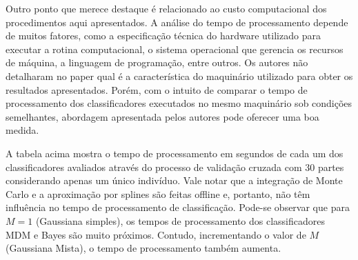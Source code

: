 \documentclass[a4paper,titlepage]{article}
\begin{document}
Outro ponto que merece destaque é relacionado ao custo computacional dos
procedimentos aqui apresentados. A análise do tempo de processamento depende
de muitos fatores, como a especificação técnica do hardware utilizado para
executar a rotina computacional, o sistema operacional que gerencia os recursos
de máquina, a linguagem de programação, entre outros. Os autores não detalharam
no paper qual é a característica do maquinário utilizado para obter os resultados
apresentados. Porém, com o intuito de comparar o tempo de processamento dos
classificadores executados no mesmo maquinário sob condições semelhantes,
abordagem apresentada pelos autores pode oferecer uma boa medida.

\begin{center}
  \vspace{1em}
  \vspace{1em}
\end{center}

A tabela acima mostra o tempo de processamento em segundos de cada um dos
classificadores avaliados através do processo de validação cruzada com 30
partes considerando apenas um único indivíduo. Vale notar que a integração
de Monte Carlo e a aproximação por splines são feitas offline e, portanto,
não têm influência no tempo de processamento de classificação. Pode-se observar
que para $M=1$ (Gaussiana simples), os tempos de processamento dos
classificadores MDM e Bayes são muito próximos. Contudo, incrementando o valor
de $M$ (Gaussiana Mista), o tempo de processamento também aumenta.

\begin{center}
  \vspace{1em}
  \vspace{1em}
\end{center}
\end{document}
